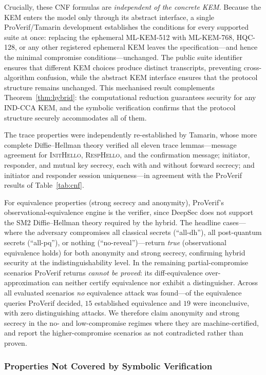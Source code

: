 \documentclass{SCIS2026}
\newcommand{\initmsg}{\textsc{InitHello}\xspace}
\newcommand{\respmsg}{\textsc{RespHello}\xspace}
\begin{document}
Crucially, these CNF formulas are \emph{independent of the concrete
KEM}.  Because the KEM enters the model only through its abstract
interface, a single ProVerif/Tamarin development establishes the
conditions for every supported suite at once: replacing the ephemeral
ML-KEM-512 with ML-KEM-768, HQC-128, or any other registered ephemeral
KEM leaves the specification---and hence the minimal
compromise conditions---unchanged.  The public suite identifier ensures
that different KEM choices produce distinct transcripts, preventing
cross-algorithm confusion, while the abstract KEM interface ensures that
the protocol structure remains unchanged.  This mechanised result
complements
Theorem~\ref{thm:hybrid}: the computational reduction guarantees
security for any IND-CCA KEM, and the symbolic verification confirms
that the protocol structure securely accommodates all of them.

The trace properties were independently re-established by Tamarin,
whose more complete Diffie--Hellman theory verified all eleven trace
lemmas---message agreement for \initmsg, \respmsg, and the confirmation
message; initiator, responder, and mutual key secrecy, each with and
without forward secrecy; and initiator and responder session
uniqueness---in agreement with the ProVerif results of
Table~\ref{tab:cnf}.

For equivalence properties (strong secrecy and anonymity), ProVerif's
observational-equivalence engine is the verifier, since DeepSec does
not support the SM2 Diffie--Hellman theory required by the hybrid.  The
headline cases---where the adversary compromises all classical secrets
(``all-dh''), all post-quantum secrets (``all-pq''), or nothing
(``no-reveal'')---return \textit{true} (observational equivalence
holds) for both anonymity and strong secrecy, confirming hybrid
security at the indistinguishability level.  In the remaining
partial-compromise scenarios ProVerif returns \textit{cannot be
proved}: its diff-equivalence over-approximation can neither certify
equivalence nor exhibit a distinguisher.  Across all evaluated
scenarios \emph{no} equivalence attack was found---of the equivalence
queries ProVerif decided, $15$ established equivalence and $19$ were
inconclusive, with zero distinguishing attacks.  We therefore claim
anonymity and strong secrecy in the no- and low-compromise regimes
where they are machine-certified, and report the higher-compromise
scenarios as not contradicted rather than proven.

\subsubsection{Properties Not Covered by Symbolic Verification}
\label{sec:notcovered}
\end{document}
